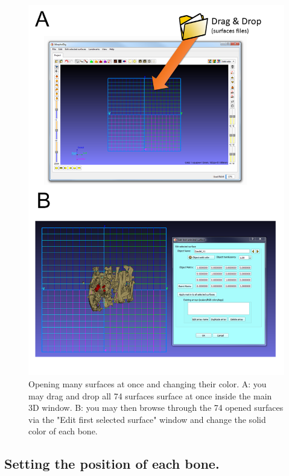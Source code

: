\documentclass[12pt, a4paper]{book}
\begin{document}
\begin{figure}
  \centering
  \includegraphics[scale=0.55]{drag_and_drop.png} 
	\caption{Opening many surfaces at once and changing their color.  A: you may drag and drop all 74 surfaces surface at once inside the main 3D window.  B: you may then browse through the 74 opened surfaces via the "Edit first selected surface" window and change the solid color of each bone. }
\label{drag_and_drop}
 
\end{figure}


\subsection{Setting the position of each bone.}
\end{document}
